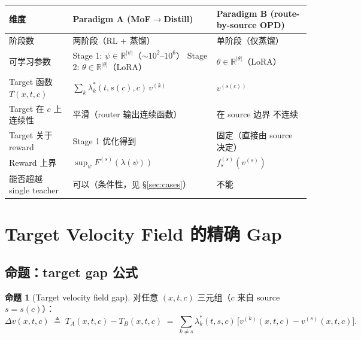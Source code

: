 \documentclass[11pt,a4paper]{article}
\newcommand{\R}{\mathbb{R}}
\theoremstyle{definition}
\newtheorem{proposition}{命题}
\begin{document}
\begin{center}
\renewcommand{\arraystretch}{1.4}
\footnotesize
\begin{tabular}{@{}p{3.5cm} p{5cm} p{5.5cm}@{}}
\toprule
\textbf{维度} & \textbf{Paradigm A (MoF$\to$Distill)} & \textbf{Paradigm B (route-by-source OPD)} \\
\midrule
阶段数 & 两阶段（RL + 蒸馏）& 单阶段（仅蒸馏）\\
\midrule
可学习参数 & Stage 1: $\psi \in \R^{|\psi|}$（$\sim 10^2$--$10^6$）\newline
Stage 2: $\theta \in \R^{|\theta|}$（LoRA） &
$\theta \in \R^{|\theta|}$（LoRA） \\
\midrule
Target 函数 $T(x, t, c)$ & $\sum_k \lambda_k^*(t, s(c), c)\,v^{(k)}$ & $v^{(s(c))}$ \\
\midrule
Target 在 $c$ 上连续性 & 平滑（router 输出连续函数） & 在 source 边界
不连续 \\
\midrule
Target 关于 reward & Stage 1 优化得到 & 固定（直接由 source 决定） \\
\midrule
Reward 上界 & $\sup_\psi F^{(s)}(\lambda(\psi))$ & $f_s^{(s)}(v^{(s)})$ \\
\midrule
能否超越 single teacher & 可以（条件性，见 \S\ref{sec:cases}） & 不能 \\
\bottomrule
\end{tabular}
\end{center}

\section{Target Velocity Field 的精确 Gap}
\label{sec:target_gap}

\subsection{命题：target gap 公式}

\begin{proposition}[Target velocity field gap]
\label{prop:target_gap}
对任意 $(x, t, c)$ 三元组（$c$ 来自 source $s = s(c)$）：
\begin{equation}
\boxed{
\Delta v(x, t, c) \;\triangleq\; T_A(x, t, c) - T_B(x, t, c) \;=\; \sum_{k \neq s} \lambda_k^*(t, s, c)\,\bigl[v^{(k)}(x, t, c) - v^{(s)}(x, t, c)\bigr].
}
\label{eq:Delta_v}
\end{equation}
\end{proposition}
\end{document}
